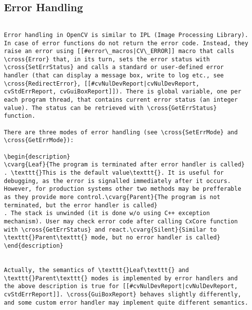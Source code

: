 \subsection{Error Handling}
\begin{verbatim}

Error handling in OpenCV is similar to IPL (Image Processing Library). In case of error functions do not return the error code. Instead, they raise an error using [[#error\_macros|CV\_ERROR]] macro that calls \cross{Error} that, in its turn, sets the error status with \cross{SetErrStatus} and calls a standard or user-defined error handler (that can display a message box, write to log etc., see \cross{RedirectError}, [[#cvNulDevReport|cvNulDevReport, cvStdErrReport, cvGuiBoxReport]]). There is global variable, one per each program thread, that contains current error status (an integer value). The status can be retrieved with \cross{GetErrStatus} function.

There are three modes of error handling (see \cross{SetErrMode} and \cross{GetErrMode}):

\begin{description}
\cvarg{Leaf}{The program is terminated after error handler is called}
. \texttt{}This is the default value\texttt{}. It is useful for debugging, as the error is signalled immediately after it occurs. However, for production systems other two methods may be prefferable as they provide more control.\cvarg{Parent}{The program is not terminated, but the error handler is called}
. The stack is unwinded (it is done w/o using C++ exception mechanism). User may check error code after calling CxCore function with \cross{GetErrStatus} and react.\cvarg{Silent}{Similar to \texttt{}Parent\texttt{} mode, but no error handler is called}
\end{description}


Actually, the semantics of \texttt{}Leaf\texttt{} and \texttt{}Parent\texttt{} modes is implemented by error handlers and the above description is true for [[#cvNulDevReport|cvNulDevReport, cvStdErrReport]]. \cross{GuiBoxReport} behaves slightly differently, and some custom error handler may implement quite different semantics.


\end{verbatim}
